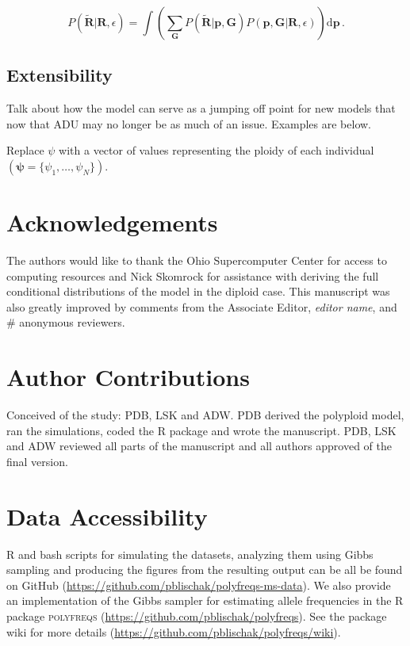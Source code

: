\documentclass[11pt,english,letterpaper,oneside]{article}
\begin{document}
\begin{equation}
P(\tilde{\bm{R}}|\bm{R},\epsilon) = \int \left(\displaystyle\sum_{\bm{G}} P(\tilde{\bm{R}}|\bm{p},\bm{G}) P(\bm{p},\bm{G}|\bm{R},\epsilon)\right) \text{d}\bm{p}\, .
\end{equation}

\medskip
\subsection*{Extensibility}
\medskip

Talk about how the model can serve as a jumping off point for new models that now that ADU may no longer be as much of an issue. Examples are below.
\medskip

Replace $\psi$ with a vector of values representing the ploidy of each individual $(\bm{\psi} = \{\psi_1,\ldots,\psi_N\})$.
\medskip



\section*{Acknowledgements}           %

The authors would like to thank the Ohio Supercomputer Center for access to computing resources and Nick Skomrock for assistance with deriving the full conditional distributions of the model in the diploid case. This manuscript was also greatly improved by comments from the Associate Editor, \textit{editor name}, and \# anonymous reviewers.
\medskip

\section*{Author Contributions}        %

Conceived of the study: PDB, LSK and ADW. PDB derived the polyploid model, ran the simulations, coded the R package and wrote the manuscript. PDB, LSK and ADW reviewed all parts of the manuscript and all authors approved of the final version.
\medskip

\section*{Data Accessibility}            %

R and bash scripts for simulating the datasets, analyzing them using Gibbs sampling and producing the figures from the resulting output can be all be found on GitHub (\url{https://github.com/pblischak/polyfreqs-ms-data}). We also provide an implementation of the Gibbs sampler for estimating allele frequencies in the R package \textsc{polyfreqs} (\url{https://github.com/pblischak/polyfreqs}). See the package wiki for more details (\url{https://github.com/pblischak/polyfreqs/wiki}).
\vspace{0.5in}
\end{document}
